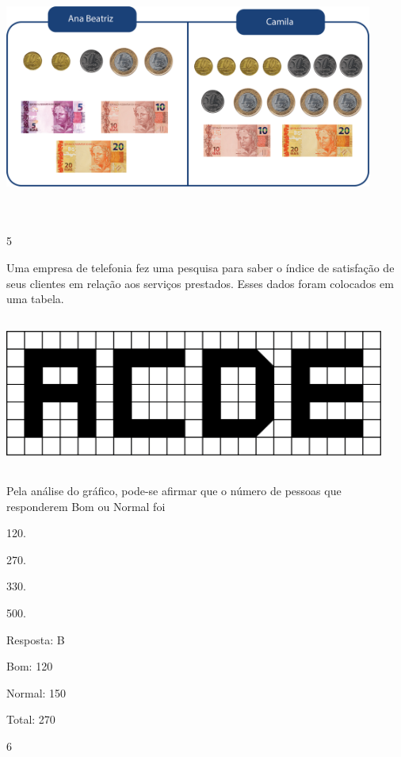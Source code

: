 \begin{multicols}{2}
\begin{enumerate}
{\includegraphics[width=4.76708in,height=3.21695in]{media/image95.png}

\num{5}

Uma empresa de telefonia fez uma pesquisa para saber o índice de
satisfação de seus clientes em relação aos serviços prestados. Esses dados foram
colocados em uma tabela.


\includegraphics[width=4.92543in,height=1.97517in]{media/image96.png}

Pela análise do gráfico, pode-se afirmar que o número de pessoas que
responderem Bom ou Normal foi

\begin{escolha}
\item
  120.
\item
  270.
\item
  330.
\item
  500.
\end{escolha}

Resposta: B

Bom: 120

Normal: 150

Total: 270

\num{6}

}
\end{enumerate}
\end{multicols}
